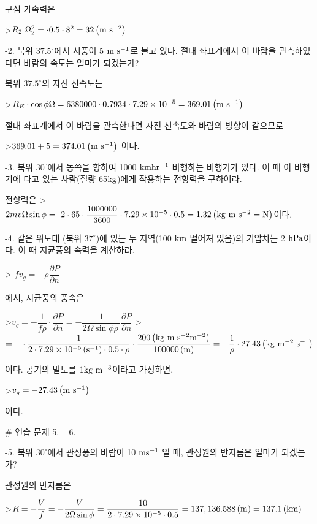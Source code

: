 구심 가속력은

>$ {R}_{2} ~ {\Omega}_{2}^{2}
= \cdot 0.5 \cdot 8^{2}
= 32 \left( \rm m ~ s^{-2} \right)$

-2.  북위  $37.5^{\circ}$에서 서풍이 5 $\rm m ~ s^{-1} $로 불고 있다. 절대 좌표계에서 이 바람을 관측하였다면 바람의 속도는 얼마가 되겠는가?

북위 $37.5^{\circ}$의 자전 선속도는

>$R_{E} \cdot \cos \phi \Omega
= 6380000 \cdot 0.7934 \cdot 7.29 \times 10^{-5}
= 369.01 \left( \rm m ~ s^{-1} \right)$


절대 좌표계에서 이 바람을 관측한다면 자전 선속도와 바람의 방향이 같으므로

>$369.01 + 5 = 374.01 \left( \rm m ~ s^{-1} \right)$ 이다.

-3.  북위  $30^{\circ}$에서 동쪽을 항하여 1000 $\rm km hr^{-1}$ 비행하는 비행기가 있다. 이 때 이 비행기에 타고 있는 사람(질량 65$\rm kg$)에게 작용하는 전향력을 구하여라.

전향력은 
>$ 2 m v \Omega \sin \phi
= \  2 \cdot 65 \cdot \dfrac{1000000} {3600} \cdot 7.29 \times 10^{-5} \cdot 0.5
= 1.32 \left( \rm kg~m ~ s^{-2} = N \right) $이다.

-4.  같은 위도대 (북위  $37^{\circ}$)에 있는 두 지역(100 $\rm km$ 떨어져 있음)의 기압차는 2 $\rm hPa$이다. 이 때 지균풍의 속력을 계산하라.

> $ f v_{g} = - {\rho} \dfrac{\partial P}{\partial n} $

에서, 지균풍의 풍속은 

>$ v_{g} = - \dfrac{1}{f \rho} \cdot \dfrac{\partial P}{\partial n}
= - \dfrac{1}{2 \Omega \sin \phi \rho~} \dfrac{\partial P}{\partial n} $
>$= - \cdot \dfrac{1}{2 \cdot 7.29 \times 10^{-5} \left( \rm s^{-1} \right) \cdot 0.5 \cdot \rho} \cdot \dfrac{200 \left( \rm kg~m~s^{-2} m^{-2} \right)} {100000 \left( \rm m \right)} 
= - \dfrac{1}{\rho} \cdot 27.43 \left( \rm kg~m^{-2}~ s^{-1} \right) $

이다. 공기의 밀도를 $ 1\rm kg~m^{-3}$이라고 가정하면, 

>$v_{g} = - 27.43 \left( \rm m~ s^{-1} \right) $

이다.



# 연습 문제 5. ~ 6.


-5. 북위  $30^{\circ}$에서 관성풍의 바람이 10 $\rm m s^{-1}$ 일 때, 관성원의 반지름은 얼마가 되겠는가?


관성원의 반지름은 

>$ R = - \dfrac{V}{f} = - \dfrac{V}{2 \Omega \sin \phi} = \dfrac{10}{2 \cdot 7.29 \times 10^{-5} \cdot 0.5} = 137,136.588 \left( \rm m \right) = 137.1 \left( \rm km \right)$

